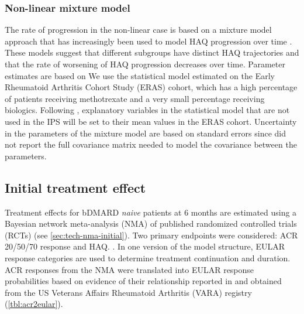 \documentclass[11pt,final,fleqn]{article}\usepackage[]{graphicx}\usepackage[]{color}
\theoremstyle{plain}
\begin{document}
\subsubsection{Non-linear mixture model} \label{sec:haq-mixture}

The rate of progression in the non-linear case is based on a mixture model approach that has increasingly been used to model HAQ progression over time \citep{stevenson2016adalimumab, norton2013trajectories, norton2014health}. These models suggest that different subgroups have distinct HAQ trajectories and that the rate of worsening of HAQ progression decreases over time. Parameter estimates are based on We use the statistical model estimated on the Early Rheumatoid Arthritis Cohort Study (ERAS) cohort, which has a high percentage of patients receiving methotrexate and a very small percentage receiving biologics. Following \citet{stevenson2016adalimumab}, explanatory variables in the statistical model that are not used in the IPS will be set to their mean values in the ERAS cohort. Uncertainty in the parameters of the mixture model are based on standard errors since \citet{norton2013trajectories} did not report the full covariance matrix needed to model the covariance between the parameters.

\subsection{Initial treatment effect}\label{initial-treatment-effect}

Treatment effects for bDMARD \emph{naive} patients at 6 months are
estimated using a Bayesian network meta-analysis (NMA) of published
randomized controlled trials (RCTs) (see \autoref{sec:tech-nma-initial}).
Two primary endpoints were considered: ACR 20/50/70 response and HAQ.
. In one version of the model
structure, EULAR response categories are used to determine treatment
continuation and duration. ACR responses from the NMA were translated
into EULAR response probabilities based on evidence of their
relationship reported in \citet{stevenson2016adalimumab} and obtained
from the US Veterans Affairs Rheumatoid Arthritis (VARA) registry
(\autoref{tbl:acr2eular}).
\end{document}
